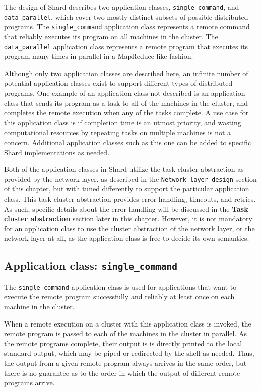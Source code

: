 \documentclass[twoside]{report}
\begin{document}
The design of Shard describes two application classes, \texttt{single\_command}, and \texttt{data\_parallel}, which cover two mostly distinct subsets of possible distributed programs.
The \texttt{single\_command} application class represents a remote command that reliably executes its program on all machines in the cluster.
The \texttt{data\_parallel} application class represents a remote program that executes its program many times in parallel in a MapReduce-like fashion.

Although only two application classes are described here, an infinite number of potential application classes exist to support different types of distributed programs.
One example of an application class not described is an application class that sends its program as a task to all of the machines in the cluster, and completes the remote execution when any of the tasks complete.
A use case for this application class is if completion time is an utmost priority, and wasting computational resources by repeating tasks on multiple machines is not a concern.
Additional application classes such as this one can be added to specific Shard implementations as needed.

Both of the application classes in Shard utilize the task cluster abstraction as provided by the network layer, as described in the \texttt{Network layer design} section of this chapter, but with tuned differently to support the particular application class.
This task cluster abstraction provides error handling, timeouts, and retries.
As such, specific details about the error handling will be discussed in the \textbf{Task cluster abstraction} section later in this chapter.
However, it is not mandatory for an application class to use the cluster abstraction of the network layer, or the network layer at all, as the application class is free to decide its own semantics.

\subsection{Application class: \texttt{single\_command}}

The \texttt{single\_command} application class is used for applications that want to execute the remote program successfully and reliably at least once on each machine in the cluster.

When a remote execution on a cluster with this application class is invoked, the remote program is passed to each of the machines in the cluster in parallel.
As the remote programs complete, their output is is directly printed to the local standard output, which may be piped or redirected by the shell as needed.
Thus, the output from a given remote program always arrives in the same order, but there is no guarantee as to the order in which the output of different remote programs arrive.
\end{document}
